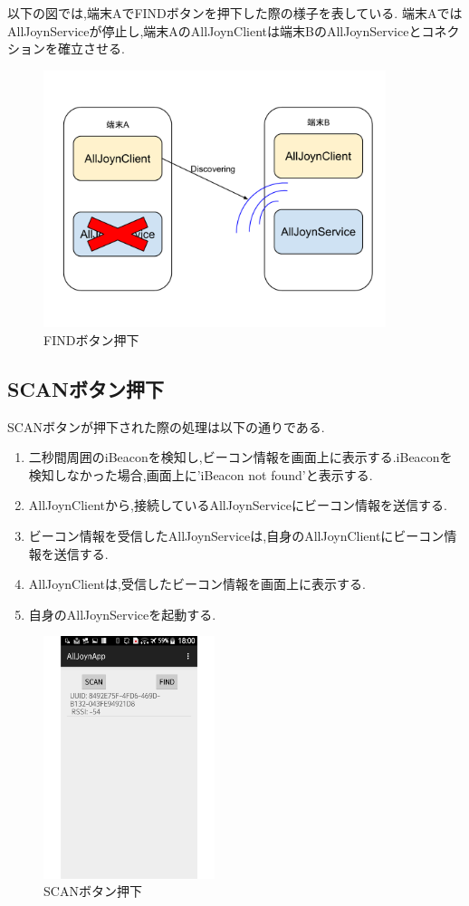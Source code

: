 以下の図では,端末AでFINDボタンを押下した際の様子を表している.
端末AではAllJoynServiceが停止し,端末AのAllJoynClientは端末BのAllJoynServiceとコネクションを確立させる.

\begin{figure}[htbp]
\centering
\includegraphics[width=10cm]{fig/click_find.pdf}
\caption{FINDボタン押下}
\end{figure}

\newpage

\subsection{SCANボタン押下}
SCANボタンが押下された際の処理は以下の通りである.
\begin{enumerate}
\item 二秒間周囲のiBeaconを検知し,ビーコン情報を画面上に表示する.iBeaconを検知しなかった場合,画面上に'iBeacon not found'と表示する.
\item AllJoynClientから,接続しているAllJoynServiceにビーコン情報を送信する.
\item ビーコン情報を受信したAllJoynServiceは,自身のAllJoynClientにビーコン情報を送信する.
\item AllJoynClientは,受信したビーコン情報を画面上に表示する.
\item 自身のAllJoynServiceを起動する.
\end{enumerate}


\begin{figure}[htbp]
\centering
\includegraphics[width=5cm]{fig/screen3.pdf}
\caption{SCANボタン押下}
\end{figure}

